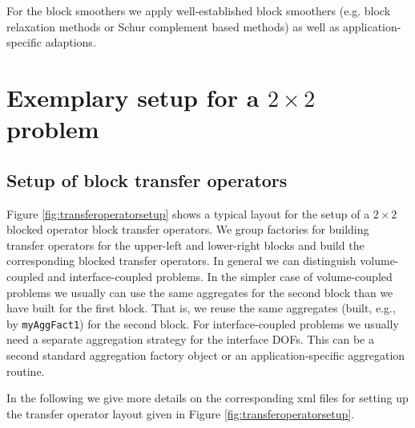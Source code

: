 \documentclass[10pt,fleqn]{book}
\begin{document}
For the block smoothers we apply well-established block smoothers (e.g. block relaxation methods or Schur complement based methods) as well as application-specific adaptions.

\section{Exemplary setup for a $2\times 2$ problem}

\subsection{Setup of block transfer operators}
\label{sec:blocktransfersetup}

Figure \ref{fig:transferoperatorsetup} shows a typical layout for the setup of a $2\times 2$ blocked operator block transfer operators. We group factories for building transfer operators for the upper-left and lower-right blocks and build the corresponding blocked transfer operators. In general we can distinguish volume-coupled and interface-coupled problems. In the simpler case of volume-coupled problems we usually can use the same aggregates for the second block than we have built for the first block. That is, we reuse the same aggregates (built, e.g., by \texttt{myAggFact1}) for the second block. For interface-coupled problems we usually need a separate aggregation strategy for the interface DOFs. This can be a second standard aggregation factory object or an application-specific aggregation routine.

In the following we give more details on the corresponding xml files for setting up the transfer operator layout given in Figure \ref{fig:transferoperatorsetup}.
\end{document}
